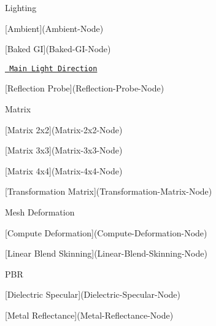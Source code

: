 \begin{DoxyItemize}
\begin{DoxyItemize}
\begin{DoxyItemize}
\begin{DoxyItemize}
\item {}
\item {}
\item {}
\end{DoxyItemize}
\item Lighting
\begin{DoxyItemize}
\item \mbox{[}Ambient\mbox{]}(Ambient-\/\+Node)
\item \mbox{[}Baked GI\mbox{]}(Baked-\/\+GI-\/\+Node)
\item \href{https://docs.unity3d.com/Packages/com.unity.shadergraph@13.1/manual/Main-Light-Direction-Node.html}{\texttt{ Main Light Direction}}
\item \mbox{[}Reflection Probe\mbox{]}(Reflection-\/\+Probe-\/\+Node)
\end{DoxyItemize}
\item Matrix
\begin{DoxyItemize}
\item \mbox{[}Matrix 2x2\mbox{]}(Matrix-\/2x2-\/\+Node)
\item \mbox{[}Matrix 3x3\mbox{]}(Matrix-\/3x3-\/\+Node)
\item \mbox{[}Matrix 4x4\mbox{]}(Matrix-\/4x4-\/\+Node)
\item \mbox{[}Transformation Matrix\mbox{]}(Transformation-\/\+Matrix-\/\+Node)
\end{DoxyItemize}
\item Mesh Deformation
\begin{DoxyItemize}
\item \mbox{[}Compute Deformation\mbox{]}(Compute-\/\+Deformation-\/\+Node)
\item \mbox{[}Linear Blend Skinning\mbox{]}(Linear-\/\+Blend-\/\+Skinning-\/\+Node)
\end{DoxyItemize}
\item PBR
\begin{DoxyItemize}
\item \mbox{[}Dielectric Specular\mbox{]}(Dielectric-\/\+Specular-\/\+Node)
\item \mbox{[}Metal Reflectance\mbox{]}(Metal-\/\+Reflectance-\/\+Node)

\end{DoxyItemize}
\end{DoxyItemize}
\end{DoxyItemize}
\end{DoxyItemize}
